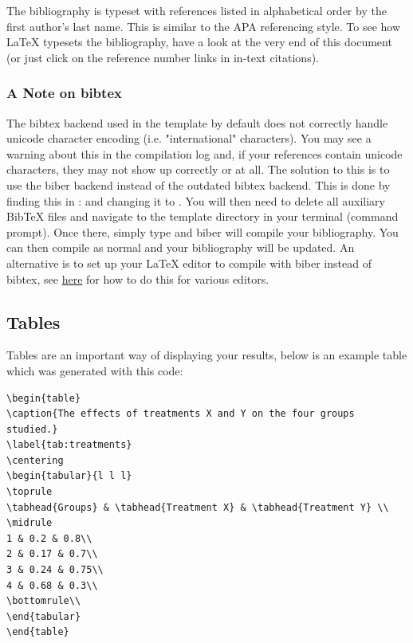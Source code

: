 The bibliography is typeset with references listed in alphabetical order by the 
first author's last name. This is similar to the APA referencing style. To see 
how \LaTeX{} typesets the bibliography, have a look at the very end of this 
document (or just click on the reference number links in in-text citations).

\subsubsection{A Note on bibtex}

The bibtex backend used in the template by default does not correctly handle 
unicode character encoding (i.e. "international" characters). You may see a 
warning about this in the compilation log and, if your references contain 
unicode characters, they may not show up correctly or at all. The solution to 
this is to use the biber backend instead of the outdated bibtex backend. This 
is done by finding this in :  and changing 
it to . You will then need to delete all auxiliary BibTeX 
files and navigate to the template directory in your terminal (command prompt). 
Once there, simply type  and biber will compile your bibliography. 
You can then compile  as normal and your bibliography will be 
updated. An alternative is to set up your LaTeX editor to compile with biber 
instead of bibtex, see \href{http://tex.stackexchange.com/questions/154751/biblatex-with-biber-configuring-my-editor-to-avoid-undefined-citations/}{here} 
for how to do this for various editors.

\subsection{Tables}

Tables are an important way of displaying your results, below is an example 
table which was generated with this code:

{\small
\begin{verbatim}
\begin{table}
\caption{The effects of treatments X and Y on the four groups studied.}
\label{tab:treatments}
\centering
\begin{tabular}{l l l}
\toprule
\tabhead{Groups} & \tabhead{Treatment X} & \tabhead{Treatment Y} \\
\midrule
1 & 0.2 & 0.8\\
2 & 0.17 & 0.7\\
3 & 0.24 & 0.75\\
4 & 0.68 & 0.3\\
\bottomrule\\
\end{tabular}
\end{table}
\end{verbatim}
}


